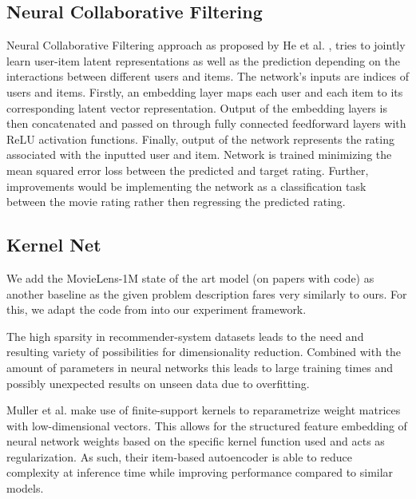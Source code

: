 \documentclass[10pt,conference,compsocconf]{IEEEtran}
\begin{document}
    \subsection{Neural Collaborative Filtering}
    Neural Collaborative Filtering approach as proposed by He et al. \cite{DBLP:journals/corr/abs-1708-05031}, tries to
    jointly learn user-item latent representations as well as the prediction depending on the interactions between
    different users and items. The network's inputs are indices of users and items. Firstly, an embedding layer maps
    each user and each item to its corresponding latent vector representation. Output of the embedding layers is then
    concatenated and passed on through fully connected feedforward layers with ReLU activation functions. Finally,
    output of the network represents the rating associated with the inputted user and item. Network is trained minimizing
    the mean squared error loss between the predicted and target rating. Further, improvements would be
    implementing the network as a classification task between the movie rating rather then regressing the predicted rating.

    \subsection{Kernel Net}
    We add the MovieLens-1M state of the art model (on papers with code) as another baseline as the given problem description fares very similarly to ours.
    For this, we adapt the code from \cite{pmlr-v80-muller18a, kernelNetGithub} into our experiment framework.

    The high sparsity in recommender-system datasets leads to the need and resulting variety of possibilities for dimensionality reduction.
    Combined with the amount of parameters in neural networks this leads to large training times and possibly
    unexpected results on unseen data due to overfitting.

    Muller et al. make use of finite-support kernels to reparametrize weight matrices with low-dimensional vectors.
    This allows for the structured feature embedding of neural network weights based on the specific kernel function used and
    acts as regularization.
    As such, their item-based autoencoder is able to reduce complexity at inference time while improving performance compared to similar models.\cite{pmlr-v80-muller18a}
\end{document}
